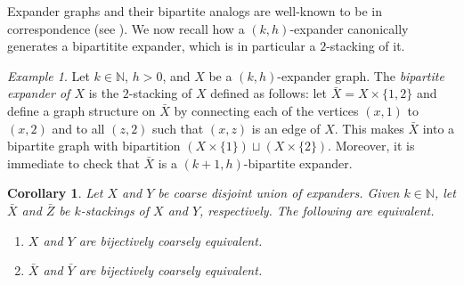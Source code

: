 \documentclass[11pt]{amsart}
\newcommand{\N}{\mathbb{N}}
\numberwithin{equation}{section}
\newtheorem{corollary}[theorem]{Corollary}
\theoremstyle{definition}
\theoremstyle{remark}
\newtheorem{example}[theorem]{Example}
\numberwithin{equation}{section}
\begin{document}
Expander graphs and their bipartite analogs are well-known to be in correspondence (see 
\cite[Remark 1.1.2.(ii)]{LubotzkyBook2010}). We now recall how a $(k,h)$-expander canonically generates a bipartitite expander, which is in particular a $2$-stacking of it. 

\begin{example}
Let $k\in\N$, $h>0$, and $X$ be a $(k,h)$-expander graph. The \emph{bipartite expander of $X$} is the $2$-stacking of $X$ defined as follows: let $\bar X=X\times \{1,2\}$ and define a graph structure on $\bar X$ by connecting each of the vertices $(x,1)$ to $(x,2)$ and to all $(z,2)$ such that $(x,z)$ is an edge of $X$. This makes $\bar X$ into a bipartite graph with bipartition $(X\times \{1\})\sqcup (X\times \{2\})$. Moreover, it is immediate to check that $\bar X$ is a $(k+1,h)$-bipartite expander. 
\end{example}

\begin{corollary}\label{CorStacking}
 Let $X$ and $Y$ be coarse disjoint union of expanders. Given $k\in\N$, let $\bar X$ and $\bar Z$ be $k$-stackings of $X$ and $Y$, respectively. The following are equivalent.
 \begin{enumerate}
 \item\label{CorStackingItem1} $X$ and $Y$ are bijectively coarsely equivalent.
 \item \label{CorStackingItem2} $\bar X$ and $\bar Y$ are bijectively coarsely equivalent.
 \end{enumerate}
\end{corollary}
\end{document}
